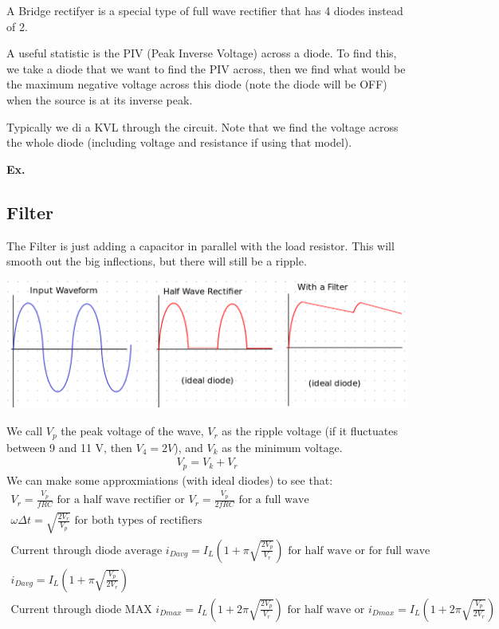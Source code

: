 \documentclass[12pt,letterpaper]{article} \usepackage{amsmath} \usepackage{graphicx} \usepackage[margin=1in]{geometry} \usepackage{longtable}  \usepackage{amssymb}
\begin{document}
	A Bridge rectifyer is a special type of full wave rectifier that has 4 diodes instead of 2. 
	
	A useful statistic is the PIV (Peak Inverse Voltage) across a diode. To find this, we take a diode that we want to find the PIV across, then we find what would be the maximum negative voltage across this diode (note the diode will be OFF) when the source is at its inverse peak. 
	
	Typically we di a KVL through the circuit. Note that we find the voltage across the whole diode (including voltage and resistance if using that model).
	
	\begin{mdframed}[]
	\textbf{Ex. }
	\end{mdframed}
	
	\subsection{Filter}
	The Filter is just adding a capacitor in parallel with the load resistor. This will smooth out the big inflections, but there will still be a ripple. 
	\begin{center}
		\includegraphics[width=0.9\linewidth]{filter}
	\end{center}

	We call $V_p$ the peak voltage of the wave, $V_r$ as the ripple voltage (if it fluctuates between 9 and 11 V, then $V_4=2V$), and $V_k$ as the minimum voltage.
	\begin{align*}
		V_p = V_k + V_r
	\end{align*}
	We can make some approxmiations (with ideal diodes) to see that:
	\begin{align*}
		V_r = \frac{V_p}{fRC} \text{ for a half wave rectifier or } V_r = \frac{V_p}{2fRC} \text{ for a full wave }\\
		\omega\Delta t = \sqrt{\frac{2V_r}{V_p}} \text{ for both types of rectifiers}\\
		\text{Current through diode average }i_{Davg} = I_L(1+\pi\sqrt{\frac{2V_p}{V_r}}) \text { for half wave or for full wave } \\ i_{Davg} = I_L (1+\pi\sqrt{\frac{V_p}{2V_r}}) \\
		\text{Current through diode MAX }i_{Dmax} = I_L(1+2\pi\sqrt{\frac{2V_p}{V_r}}) \text { for half wave or } i_{Dmax} = I_L (1+2\pi\sqrt{\frac{V_p}{2V_r}})\\
	\end{align*}
\end{document}
